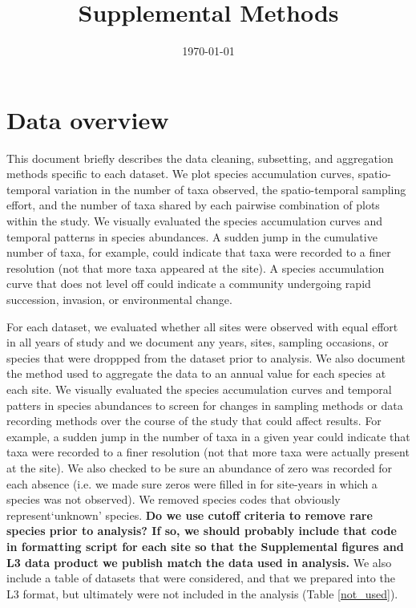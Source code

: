 \documentclass[11pt, oneside]{article}
\title{Supplemental Methods}
\author[1]{}
\author[2]{}
\author[3]{}
\date{\today}
\begin{document}
\maketitle

\doublespacing

\section {Data overview}
This document briefly describes the data cleaning, subsetting, and aggregation methods specific to each dataset.
We plot species accumulation curves, spatio-temporal variation in the number of taxa observed, the spatio-temporal sampling effort, and the number of taxa shared by each pairwise combination of plots within the study.
We visually evaluated the species accumulation curves and temporal patterns in species abundances. %
A sudden jump in the cumulative number of taxa, for example, could indicate that taxa were recorded to a finer resolution (not that more taxa appeared  at the site).  
A species accumulation curve that does not level off could indicate a community undergoing rapid succession, invasion, or environmental change. 

For each dataset, we evaluated whether all sites were observed with equal effort in all years of study and we document any years, sites, sampling occasions,  or species that were droppped from the dataset prior to analysis. 
We also document the method used to aggregate the data to an annual value for each species at each site.
We visually evaluated the species accumulation curves and temporal patters in species abundances to screen for changes in sampling methods or data recording methods over the course of the study that could affect results.
For example, a sudden jump in the number of taxa in a given year could indicate that taxa were recorded to a finer resolution (not that more taxa were actually present at the site).  
We also checked to be sure an abundance of zero was recorded for each absence (i.e. we made sure zeros were filled in for site-years in which a species was not observed).
We removed species codes that obviously represent`unknown' species.
{\bf Do we use cutoff criteria to remove rare species prior to analysis? 
If so, we  should probably include that code in formatting script for each site so that the Supplemental figures and L3 data product we publish match the data used in analysis.}
We also include a table of datasets that were considered, and that we prepared into the L3 format, but ultimately were not included in the analysis (Table \ref{not_used}).
\end{document}
